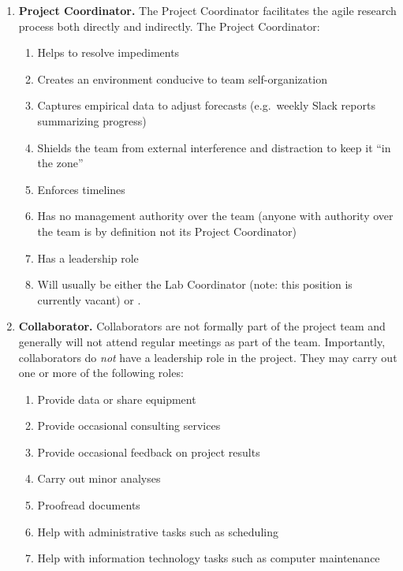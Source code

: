 \documentclass{tufte-book} %
\begin{document}
\begin{enumerate}
\item \textbf{Project Coordinator.} The Project Coordinator facilitates
  the agile research process both directly and indirectly. The Project Coordinator:
\begin{enumerate}
\item Helps to resolve impediments 
\item Creates an environment conducive to team self-organization
\item Captures empirical data to adjust forecasts (e.g.\ weekly Slack
  reports summarizing progress)
\item Shields the team from external interference and distraction to
  keep it ``in the zone''
\item Enforces timelines
\item Has no management authority over the team (anyone with authority
  over the team is by definition not its Project
  Coordinator)
\item Has a leadership role
\item Will usually be either the Lab Coordinator (note: this position is currently vacant) or \director. %
\end{enumerate}

\item \textbf{Collaborator.}  Collaborators are not formally part of
  the project team and generally will not attend regular meetings as
  part of the team.  Importantly, collaborators do \textit{not} have a leadership role in
  the project.  They may carry out one or more of the
  following roles:
\begin{enumerate}
\item Provide data or share equipment 
\item Provide occasional consulting services
\item Provide occasional feedback on project results
\item Carry out minor analyses
\item Proofread documents
\item Help with administrative tasks such as scheduling
\item Help with information technology tasks such as computer
  maintenance


\end{enumerate}
\end{enumerate}
\end{document}
